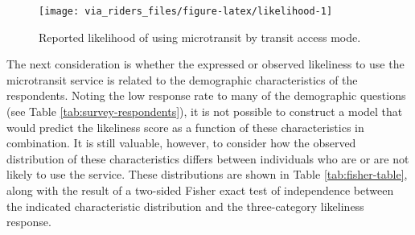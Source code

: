 \documentclass[smartcities,article,submit,moreauthors,pdftex]{mdpi}
\begin{document}
\begin{figure}
\texttt{[image: via\_riders\_files/figure-latex/likelihood-1]} \caption{Reported likelihood of using microtransit by transit access mode.}\label{fig:likelihood}
\end{figure}

The next consideration is whether the expressed or observed likeliness to use
the microtransit service is related to the demographic characteristics of the
respondents. Noting the low response rate to many of the demographic questions
(see Table \ref{tab:survey-respondents}), it is not possible to construct a model
that would predict the likeliness score as a function of these characteristics
in combination. It is still valuable, however, to consider how the observed
distribution of these characteristics differs between individuals who are or are
not likely to use the service. These distributions are shown in Table
\ref{tab:fisher-table}, along with the result of a two-sided Fisher exact test of
independence between the indicated characteristic distribution and the
three-category likeliness response.
\end{document}
